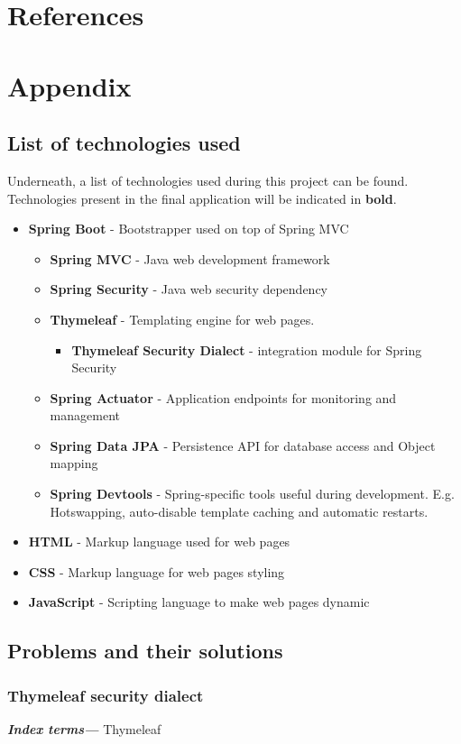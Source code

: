 \documentclass[12pt]{article}
\providecommand{\keywords}[1]{\textbf{\textit{Index terms---}} #1}
\begin{document}
\newpage
\section{References}




\newpage
\section{Appendix}
\subsection{List of technologies used}
Underneath, a list of technologies used during this project can be found. Technologies present in the final application will be indicated in \textbf{bold}.
\begin{itemize}[leftmargin=20pt]
	
	\item \textbf{Spring Boot} - Bootstrapper used on top of Spring MVC
	\begin{itemize}[leftmargin=20pt]
		\item \textbf{Spring MVC} - Java web development framework
		\item \textbf{Spring Security} - Java web security dependency
		\item \textbf{Thymeleaf} - Templating engine for web pages.
		\begin{itemize}[leftmargin=20pt]
				\item  \textbf{Thymeleaf Security Dialect} - integration module for Spring Security
		\end{itemize}
		\item \textbf{Spring Actuator} - Application endpoints for monitoring and management
		\item \textbf{Spring Data JPA} - Persistence API for database access and Object mapping
		\item \textbf{Spring Devtools} - Spring-specific tools useful during development. E.g. Hotswapping, auto-disable template caching and automatic restarts.
	\end{itemize}
	\item \textbf{HTML} - Markup language used for web pages
	\item \textbf{CSS} - Markup language for web pages styling
	\item \textbf{JavaScript} - Scripting language to make web pages dynamic
	
	
	 
\end{itemize}
\subsection{Problems and their solutions}
\subsubsection{Thymeleaf security dialect}
\keywords{Thymeleaf}
\end{document}
